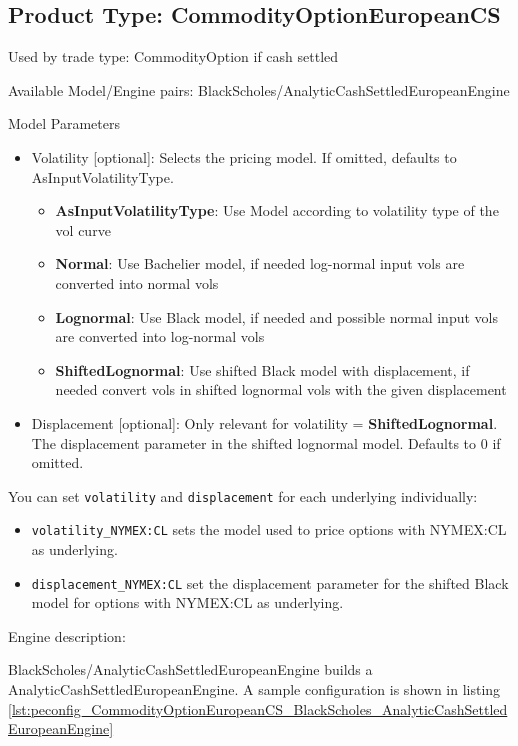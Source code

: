 \subsection{Product Type: CommodityOptionEuropeanCS}

Used by trade type: CommodityOption if cash settled

Available Model/Engine pairs: BlackScholes/AnalyticCashSettledEuropeanEngine

Model Parameters
\begin{itemize}
    \item Volatility [optional]: Selects the pricing model. If omitted, defaults to AsInputVolatilityType.
    \begin{itemize}
        \item \textbf{AsInputVolatilityType}: Use Model according to volatility type of the vol curve
        \item \textbf{Normal}: Use Bachelier model, if needed log-normal input vols are converted into normal vols
        \item \textbf{Lognormal}: Use Black model, if needed and possible normal input vols are converted into log-normal vols
        \item \textbf{ShiftedLognormal}: Use shifted Black model with displacement, if needed convert vols in shifted lognormal vols with the given displacement
    \end{itemize}
    \item Displacement [optional]: Only relevant for volatility = \textbf{ShiftedLognormal}. The displacement parameter in the shifted lognormal model. Defaults to 0 if omitted.
\end{itemize}

You can set \texttt{volatility} and \texttt{displacement} for each underlying individually:
\begin{itemize}
    \item \texttt{volatility\_NYMEX:CL} sets the model used to price options with NYMEX:CL as underlying.
    \item \texttt{displacement\_NYMEX:CL} set the displacement parameter for the shifted Black model for options with NYMEX:CL as underlying.
\end{itemize}

Engine description:

BlackScholes/AnalyticCashSettledEuropeanEngine builds a AnalyticCashSettledEuropeanEngine. A sample configuration is shown in listing
\ref{lst:peconfig_CommodityOptionEuropeanCS_BlackScholes_AnalyticCashSettledEuropeanEngine}

